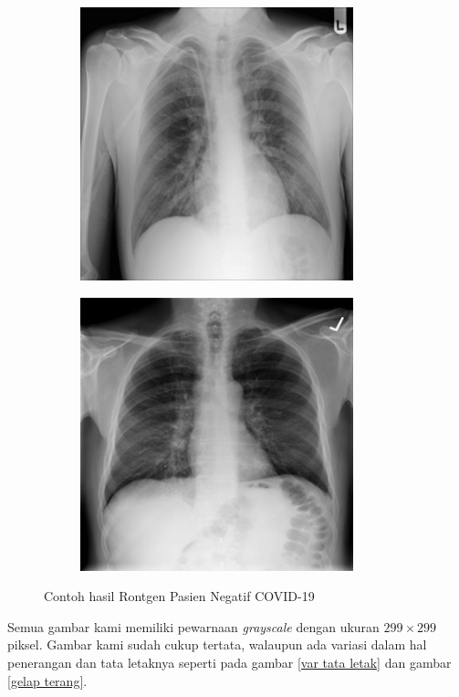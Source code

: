 \begin{figure}
\centering
\begin{subfigure}{.5\textwidth}
  \centering
  \includegraphics[width=.6\linewidth]{pics/Normal-11.png}
\end{subfigure}%
\begin{subfigure}{.5\textwidth}
  \centering
  \includegraphics[width=.6\linewidth]{pics/Normal-12.png}
\end{subfigure}
\caption{Contoh hasil Rontgen Pasien Negatif COVID-19}
\label{negatif covid}
\end{figure}

Semua gambar kami memiliki pewarnaan \textit{grayscale} dengan ukuran $299\times299$ piksel. Gambar kami sudah cukup tertata, walaupun ada variasi dalam hal penerangan dan tata letaknya seperti pada gambar \ref{var tata letak} dan gambar \ref{gelap terang}.


